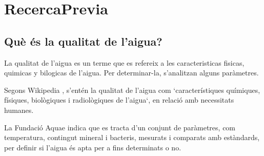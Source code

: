 \chapter{RecercaPrevia}

\section{Què és la qualitat de l’aigua?}
La qualitat de l'aigua es un terme que es refereix a les caracteristicas fisicas, quimicas y bilogicas de l'aigua. Per determinar-la, s'analitzan alguns paràmetres.

Segons Wikipedia \cite{WikiAgua}, s'entén la qualitat de l'aigua com `característiques químiques, físiques, biològiques i radiològiques de l'aigua`, en relació amb necessitats humanes.

La Fundació Aquae \cite{Fundacionaquae} indica que es tracta d'un conjunt de paràmetres, com temperatura, contingut mineral i bacteris, mesurats i comparats amb estàndards, per definir si l'aigua és apta per a fins determinats o no.
